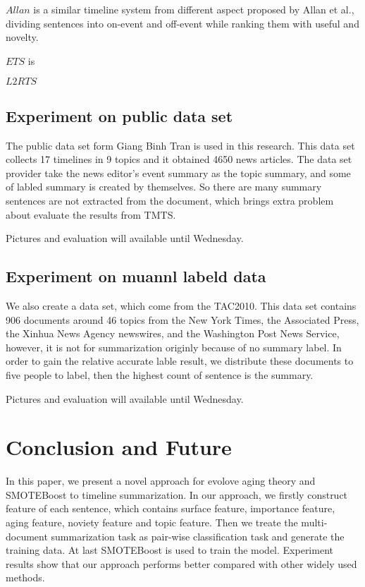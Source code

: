 \documentclass{llncs}
\begin{document}
$Allan$ is a similar timeline system from different aspect proposed by Allan et al., dividing sentences into on-event and off-event while ranking them with useful and novelty.

$ETS$ is 

$L2RTS$

\subsection{Experiment on public data set}

The public data set form Giang Binh Tran\cite{tran2013leveraging} is used in this research. This data set collects 17 timelines in 9 topics and it obtained 4650 news articles. The data set provider take the news editor's event summary as the topic summary, and some of labled summary is created by themselves. So there are many summary sentences are not extracted from the document, which brings extra problem about evaluate the results from TMTS.

Pictures and evaluation will available until Wednesday.


\subsection{Experiment on muannl labeld data}

We also create a data set, which come from the TAC2010. This data set contains 906 documents around 46 topics from the New York Times, the Associated Press, the Xinhua News Agency newswires, and the Washington Post News Service, however, it is not for summarization originly because of no summary label. In order to gain the relative accurate lable result, we distribute these documents to five people to label, then the highest count of sentence is the summary.

Pictures and evaluation will available until Wednesday.



%
\section{Conclusion and Future}
%

In this paper, we present a novel approach for evolove aging theory and SMOTEBoost to timeline summarization. In our approach, we firstly construct feature of each sentence, which contains surface feature, importance feature, aging feature, noviety feature and topic feature. Then we treate the multi-document summarization task as pair-wise classification task and generate the training data. At last SMOTEBoost is used to train the model. Experiment results show that our approach performs better compared with other widely used methods.
\end{document}
